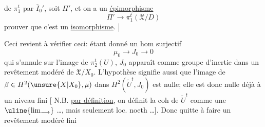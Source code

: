 de $\pi_1^t$ par $\overline I_0'$, soit
 $\Pi'$, et on a
  un \uline{épimorphisme}
\[
 \Pi'\longrightarrow\pi_1^t(\mathfrak X/D)
\]
prouver que c'est un \uline{isomorphisme}. ]

Ceci revient à vérifier ceci: étant donné un hom surjectif
\[
 \mu_0\longrightarrow J_0\longrightarrow0
\]
qui s'annule sur l'image de $\pi_2^t(U)$,
 $J_0$ apparaît comme groupe d'inertie dans
un revêtement  modéré de $\mathfrak X/X_0$.
L'hypothèse signifie aussi que l'image de
$\beta\in H^2(\unsure{X|X_0},\mu)$ dans $H^2(\widetilde U^t,J_0)$
est nulle; elle est donc nulle déjà  à un
niveau fini [ N.B. \uline{par définition}, on définit la coh de
$\widetilde U^t$ comme une $\uline{\lim_{\longrightarrow}}$ \ldots,
  
mais seulement loc. noeth \ldots ]. Donc quitte à faire
un revêtement modéré fini
